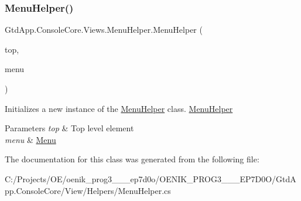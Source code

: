 \subsubsection{\texorpdfstring{Menu\+Helper()}{MenuHelper()}}
{\footnotesize\ttfamily Gtd\+App.\+Console\+Core.\+Views.\+Menu\+Helper.\+Menu\+Helper (\begin{DoxyParamCaption}\item[{G\+U\+I.\+Toplevel}]{top,  }\item[{\mbox{\hyperlink{class_gtd_app_1_1_console_core_1_1_menu_1_1_menu}{Menu}}}]{menu }\end{DoxyParamCaption})}



Initializes a new instance of the \mbox{\hyperlink{class_gtd_app_1_1_console_core_1_1_views_1_1_menu_helper}{Menu\+Helper}} class. \mbox{\hyperlink{class_gtd_app_1_1_console_core_1_1_views_1_1_menu_helper}{Menu\+Helper}} 


\begin{DoxyParams}{Parameters}
{\em top} & Top level element\\
\hline
{\em menu} & \mbox{\hyperlink{namespace_gtd_app_1_1_console_core_1_1_menu}{Menu}}\\
\hline
\end{DoxyParams}


The documentation for this class was generated from the following file\+:\begin{DoxyCompactItemize}
\item 
C\+:/\+Projects/\+O\+E/oenik\+\_\+prog3\+\_\+\_\+\_\+ep7d0o/\+O\+E\+N\+I\+K\+\_\+\+P\+R\+O\+G3\+\_\+\_\+\_\+\+E\+P7\+D0\+O/\+Gtd\+App.\+Console\+Core/\+View/\+Helpers/Menu\+Helper.\+cs\end{DoxyCompactItemize}
